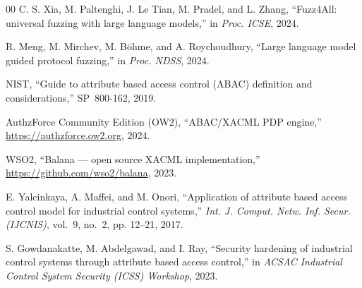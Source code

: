 \documentclass[conference]{IEEEtran}
\begin{document}
\begin{thebibliography}{00}
C. S. Xia, M. Paltenghi, J. Le Tian, M. Pradel, and L. Zhang, ``Fuzz4All:
universal fuzzing with large language models,'' in \textit{Proc. ICSE}, 2024.

R. Meng, M. Mirchev, M. B{\"o}hme, and A. Roychoudhury, ``Large language
model guided protocol fuzzing,'' in \textit{Proc. NDSS}, 2024.

NIST, ``Guide to attribute based access control (ABAC) definition and
considerations,'' SP~800-162, 2019.

AuthzForce Community Edition (OW2), ``ABAC/XACML PDP engine,''
\url{https://authzforce.ow2.org}, 2024.

WSO2, ``Balana --- open source XACML implementation,''
\url{https://github.com/wso2/balana}, 2023.

E. Yalcinkaya, A. Maffei, and M. Onori, ``Application of attribute based
access control model for industrial control systems,'' \textit{Int. J. Comput.
Netw. Inf. Secur. (IJCNIS)}, vol.~9, no.~2, pp. 12--21, 2017.

S. Gowdanakatte, M. Abdelgawad, and I. Ray, ``Security hardening of
industrial control systems through attribute based access control,'' in
\textit{ACSAC Industrial Control System Security (ICSS) Workshop}, 2023.

\end{thebibliography}
\end{document}
